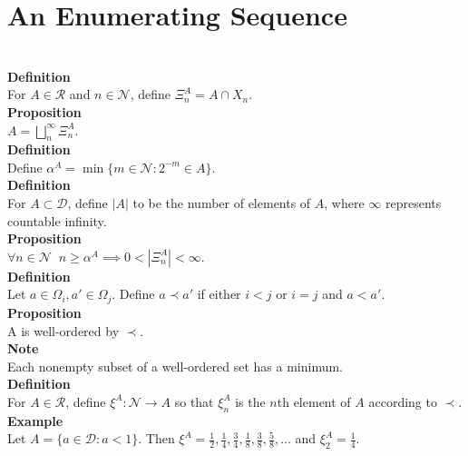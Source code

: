 \documentclass{article}
\newcommand{\targetset}{ \mathscr{R}}
\newcommand{\sourceset}{ \mathscr{D}}
\newcommand{\disjoints}{ X}
\newcommand{\naturals}{ \mathscr{N}}
\newcommand{\carpenter}{ \xi }
\newcommand{\elt}{a}
\newcommand{\intersector}{\Xi}
\newcommand{\interceptor}{\Omega}
\newcommand{\wed}{\alpha}
\begin{document}
\section{An Enumerating Sequence}\\

\textbf{Definition}\\
For $A \in \targetset$ and $ n \in \naturals$, define $\intersector^A_n = A \cap \disjoints_n$.\\

\textbf{Proposition}\\
$A = \bigsqcup_n^\infty \intersector^A_n$.\\

\textbf{Definition}\\
Define $\wed^A = \min \{ m \in \naturals : 2^{-m} \in A \}$. \\

\textbf{Definition}\\
For $A \subset \sourceset$, define $|A|$ to be the number of elements of $A$, where $\infty$ represents countable infinity.\\ 

\textbf{Proposition}\\
$\forall n \in \naturals \;\; n \ge \wed^A \implies 0 <  |\intersector^A_n| < \infty$.\\

\textbf{Definition}\\
Let $\elt \in \interceptor_i,  \elt' \in \interceptor_j$. Define $\elt \prec \elt'$ if either $i < j$ or $i = j$ and $\elt < \elt'$.\\

\textbf{Proposition}\\
A is well-ordered by $\prec.$\\

\textbf{Note}\\
Each nonempty subset of a well-ordered set has a minimum.\\ 

\textbf{Definition}\\
For $A \in \targetset$, define $\carpenter^A : \naturals \to A$ so that $\carpenter^A_n$ is the $n$th element of $A$ according to $\prec$.\\


\textbf{Example}\\
Let $A = \{ \elt \in \sourceset : \elt < 1 \}.$ Then $\carpenter^A = \frac{1}{2},\frac{1}{4},\frac{3}{4},\frac{1}{8},\frac{3}{8},\frac{5}{8}, ... $ and $\carpenter^A_2 = \frac{1}{4}$.\\
\end{document}
